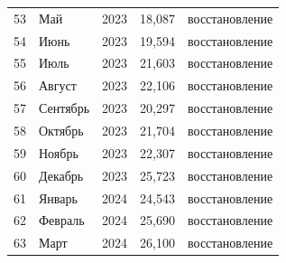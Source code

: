 \begin{center}
\begin{longtable}{c l c r l}
53 & Май      & 2023 & 18,087 & восстановление \\
54 & Июнь     & 2023 & 19,594 & восстановление \\
55 & Июль     & 2023 & 21,603 & восстановление \\
56 & Август   & 2023 & 22,106 & восстановление \\
57 & Сентябрь & 2023 & 20,297 & восстановление \\
58 & Октябрь  & 2023 & 21,704 & восстановление \\
59 & Ноябрь   & 2023 & 22,307 & восстановление \\
60 & Декабрь  & 2023 & 25,723 & восстановление \\
61 & Январь   & 2024 & 24,543 & восстановление \\
62 & Февраль  & 2024 & 25,690 & восстановление \\
63 & Март     & 2024 & 26,100 & восстановление \\
\end{longtable}
\end{center}
